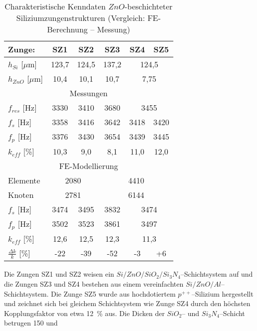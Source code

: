 \begin{table}[htb]
\caption{\label{tabzungen}
 Charakteristische Kenndaten $ZnO$-beschichteter Siliziumzungenstrukturen
 (Vergleich: FE-Berechnung -- Messung)}
\begin{center}
\begin{tabular}{|l||c|c|c|c|c|}
\hline
Zunge:              &  SZ1   &  SZ2   &  SZ3   &  SZ4 &  SZ5 \\
\hline \hline
 $h_{Si}$  [$\mu$m] & 123,7  & 124,5  &  137,2
 & \multicolumn{2}{|c|}{124,5} \\
 $h_{ZnO}$ [$\mu$m] & 10,4   & 10,1   &  10,7
 & \multicolumn{2}{|c|}{7,75} \\
\hline
 \multicolumn{6}{|c|}{Messungen} \\
\hline
 $f_{res}$ [Hz]  & 3330   & 3410   &  3680 & \multicolumn{2}{c|}{3455} \\
\hline
 $f_{s}$ [Hz]    & 3358   & 3416   &  3642   & 3418  & 3420  \\
 $f_{p}$ [Hz]    & 3376   & 3430   &  3654   & 3439  & 3445  \\
 $k_{eff}$ [\%]  & 10,3   & 9,0    &  8,1    & 11,0  & 12,0  \\
\hline
 \multicolumn{6}{|c|}{FE-Modellierung} \\
\hline
 Elemente  & \multicolumn{2}{|c|}{2080} & \multicolumn{3}{c|}{4410} \\
 Knoten    & \multicolumn{2}{|c|}{2781} & \multicolumn{3}{c|}{6144} \\
\hline
 $f_{s}$ [Hz]   & 3474   & 3495   &  3832   & \multicolumn{2}{c|}{3474} \\
 $f_{p}$ [Hz]   & 3502   & 3523   &  3861   & \multicolumn{2}{c|}{3497} \\
 $k_{eff}$ [\%] & 12,6   & 12,5   &  12,3   & \multicolumn{2}{c|}{11,3} \\
\hline
 $\frac{\Delta k}{k}$ [\%] & -22  & -39   &  -52    &   -3  & +6    \\
\hline
\end{tabular}
\end{center}
\end{table}
Die Zungen SZ1 und SZ2 weisen ein
$Si/ZnO/SiO_{2}/Si_{3}N_{4}$--Schichtsystem auf und
die Zungen SZ3 und SZ4 bestehen aus einem vereinfachten
$Si/ZnO/Al$--Schichtsystem. Die Zunge SZ5 wurde aus hochdotiertem
$p^{++}$--Silizium hergestellt und zeichnet sich bei gleichem Schichtsystem
wie Zunge SZ4 durch den höchsten Kopplungsfaktor von etwa 12~\% aus.
Die Dicken der $SiO_{2}$-- und $Si_{3}N_{4}$--Schicht betrugen 150 und
